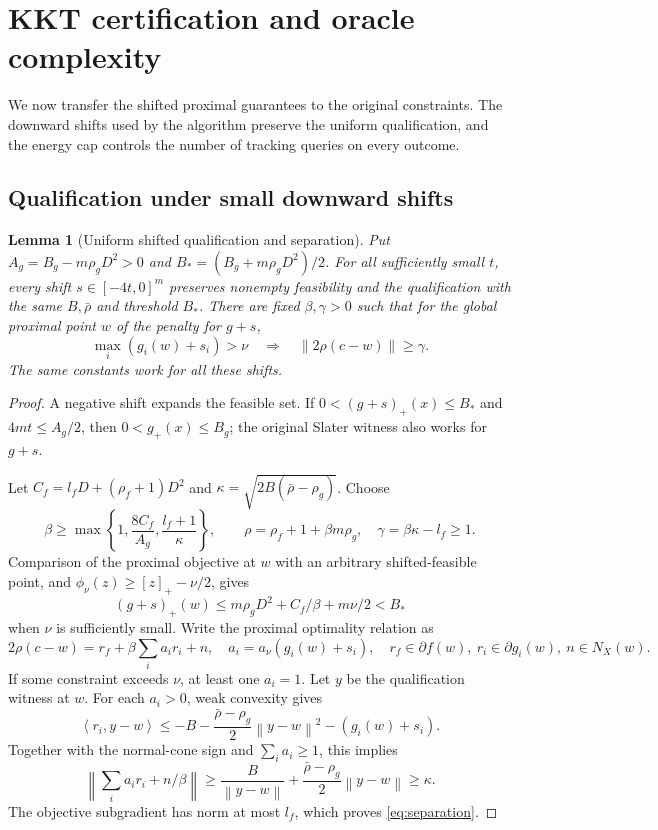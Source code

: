 \documentclass[11pt,a4paper]{article}
\newcommand{\norm}[1]{\left\lVert#1\right\rVert}
\newcommand{\ip}[2]{\left\langle#1,#2\right\rangle}
\newtheorem{lemma}[theorem]{Lemma}
\theoremstyle{remark}
\numberwithin{equation}{section}
\begin{document}
\section{KKT certification and oracle complexity}\label{sec:certification}
We now transfer the shifted proximal guarantees to the original constraints. The downward shifts used by the algorithm preserve the uniform qualification, and the energy cap controls the number of tracking queries on every outcome.

\subsection{Qualification under small downward shifts}
\begin{lemma}[Uniform shifted qualification and separation]\label{lem:qualification}
Put $A_g=B_g-m\rho_gD^2>0$ and $B_*=(B_g+m\rho_gD^2)/2$. For all sufficiently small $t$, every shift $s\in[-4t,0]^m$ preserves nonempty feasibility and the qualification with the same $B,\bar\rho$ and threshold $B_*$. There are fixed $\beta,\gamma>0$ such that for the global proximal point $w$ of the penalty for $g+s$,
\begin{equation}
 \max_i(g_i(w)+s_i)>\nu\quad\Longrightarrow\quad
 \norm{2\rho(c-w)}\ge\gamma.
 \label{eq:separation}
\end{equation}
The same constants work for all these shifts.
\end{lemma}
\begin{proof}
A negative shift expands the feasible set. If $0<(g+s)_+(x)\le B_*$ and $4mt\le A_g/2$, then $0<g_+(x)\le B_g$; the original Slater witness also works for $g+s$.

Let $C_f=l_fD+(\rho_f+1)D^2$ and $\kappa=\sqrt{2B(\bar\rho-\rho_g)}$. Choose
\[
 \beta\ge\max\left\{1,\frac{8C_f}{A_g},\frac{l_f+1}{\kappa}\right\},
 \qquad\rho=\rho_f+1+\beta m\rho_g,\quad \gamma=\beta\kappa-l_f\ge1.
\]
Comparison of the proximal objective at $w$ with an arbitrary shifted-feasible point, and $\phi_\nu(z)\ge[z]_+-\nu/2$, gives
\[
 (g+s)_+(w)\le m\rho_gD^2+C_f/\beta+m\nu/2<B_*
\]
when $\nu$ is sufficiently small. Write the proximal optimality relation as
\[
 2\rho(c-w)=r_f+\beta\sum_i a_i r_i+n,
 \quad a_i=a_\nu(g_i(w)+s_i),\quad
 r_f\in\partial f(w),\ r_i\in\partial g_i(w),\ n\in N_X(w).
\]
 If some constraint exceeds $\nu$, at least one $a_i=1$. Let $y$ be the qualification witness at $w$. For each $a_i>0$, weak convexity gives
\[
 \ip{r_i}{y-w}\le-B-\frac{\bar\rho-\rho_g}{2}\norm{y-w}^2-(g_i(w)+s_i).
\]
Together with the normal-cone sign and $\sum_i a_i\ge1$, this implies
\[
 \norm{\sum_i a_i r_i+n/\beta}
 \ge\frac B{\norm{y-w}}+\frac{\bar\rho-\rho_g}{2}\norm{y-w}\ge\kappa.
\]
The objective subgradient has norm at most $l_f$, which proves \eqref{eq:separation}.
\end{proof}
\end{document}
